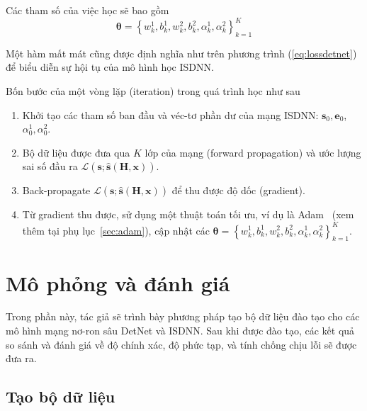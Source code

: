 Các tham số của việc học sẽ bao gồm 
\begin{equation}
\boldsymbol{\theta}=\left\{w^1_{k}, b^1_{k}, w^2_{k}, b^2_{k}, \alpha^1_k, \alpha^2_k \right\}_{k=1}^K
\end{equation}

Một hàm mất mát cũng được định nghĩa như trên phương trình (\ref{eq:lossdetnet}) để biểu diễn sự hội tụ của mô hình học ISDNN.

Bốn bước của một vòng lặp (iteration) trong quá trình học như sau
\begin{enumerate}
    \item Khởi tạo các tham số ban đầu và véc-tơ phần dư của mạng ISDNN: $\mathbf{s}_0, \mathbf{e}_0$, $\alpha^1_0, \alpha^2_0$.

    \item Bộ dữ liệu được đưa qua $K$ lớp của mạng (forward propagation) và ước lượng sai số đầu ra $\mathcal{L}(\mathbf{s}; \hat{\mathbf{s}}(\mathbf{H}, \mathbf{x}))$.

    \item Back-propagate $\mathcal{L}(\mathbf{s}; \hat{\mathbf{s}}(\mathbf{H}, \mathbf{x}))$ để thu được độ dốc (gradient).

    \item Từ gradient thu được, sử dụng một thuật toán tối ưu, ví dụ là Adam~\cite{Diederik2014} (xem thêm tại phụ lục~\ref{sec:adam}), cập nhật các $\boldsymbol{\theta}=\left\{w^1_{k}, b^1_{k}, w^2_{k}, b^2_{k}, \alpha^1_k, \alpha^2_k \right\}_{k=1}^K$.
\end{enumerate}
\section{Mô phỏng và đánh giá}

Trong phần này, tác giả sẽ trình bày phương pháp tạo bộ dữ liệu đào tạo cho các mô hình mạng nơ-ron sâu DetNet và ISDNN. Sau khi được đào tạo, các kết quả so sánh và đánh giá về độ chính xác, độ phức tạp, và tính chống chịu lỗi sẽ được đưa ra.
\subsection{Tạo bộ dữ liệu}

